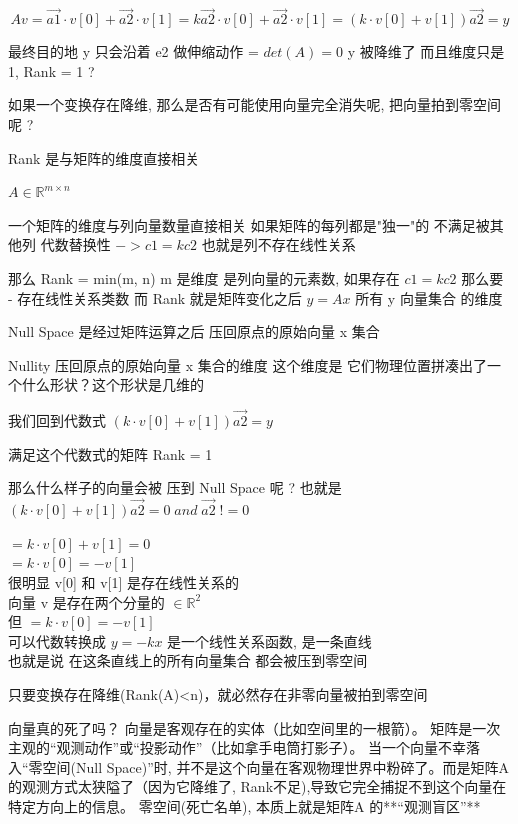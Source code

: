 \documentclass[12pt]{article}
\begin{document}
\[ Av  =  \vec{a1} \cdot v[0] + \vec{a2} \cdot v[1]  =  k \vec{a2} \cdot v[0] + \vec{a2} \cdot v[1]
    =  (k \cdot v[0] + v[1])\vec{a2}  = y \]

最终目的地 y 只会沿着 e2 做伸缩动作  = $det(A) = 0$ y 被降维了 而且维度只是 1, Rank = 1 ?

如果一个变换存在降维, 那么是否有可能使用向量完全消失呢, 把向量拍到零空间呢 ?

Rank 是与矩阵的维度直接相关

$A \in \mathbb{R}^{m \times n}$

一个矩阵的维度与列向量数量直接相关 如果矩阵的每列都是"独一"的 不满足被其他列 代数替换性 $-> c1 = kc2 $ 也就是列不存在线性关系

那么 Rank = min(m, n) m 是维度 是列向量的元素数, 如果存在 $c1 = kc2 $ 那么要 - 存在线性关系类数
而 Rank 就是矩阵变化之后 $y = Ax$ 所有 y 向量集合 的维度

Null Space 是经过矩阵运算之后 压回原点的原始向量 x 集合

Nullity 压回原点的原始向量 x 集合的维度 这个维度是 它们物理位置拼凑出了一个什么形状？这个形状是几维的

我们回到代数式 $ (k \cdot v[0] + v[1])\vec{a2}  = y$

满足这个代数式的矩阵 Rank = 1

那么什么样子的向量会被 压到 Null Space 呢 ?
也就是 $ (k \cdot v[0] + v[1])\vec{a2}  = 0 \; and \; \vec{a2} \; != 0$

$ =  k \cdot v[0] + v[1] = 0 $ \\
$ =  k \cdot v[0] = -v[1] $ \\

很明显 v[0] 和 v[1] 是存在线性关系的 \\
向量 v 是存在两个分量的 $ \in \mathbb{R}^{2}$ \\
但  $ =  k \cdot v[0] = -v[1] $ \\ 可以代数转换成 $y = -kx$ 是一个线性关系函数, 是一条直线 \\
也就是说 在这条直线上的所有向量集合 都会被压到零空间

只要变换存在降维(Rank(A)<n)，就必然存在非零向量被拍到零空间


向量真的死了吗？
向量是客观存在的实体（比如空间里的一根箭）。
矩阵是一次主观的“观测动作”或“投影动作”（比如拿手电筒打影子）。
当一个向量不幸落入“零空间(Null Space)”时, 并不是这个向量在客观物理世界中粉碎了。而是矩阵A
的观测方式太狭隘了（因为它降维了, Rank不足),导致它完全捕捉不到这个向量在特定方向上的信息。
零空间(死亡名单), 本质上就是矩阵A 的**“观测盲区”**
\end{document}
